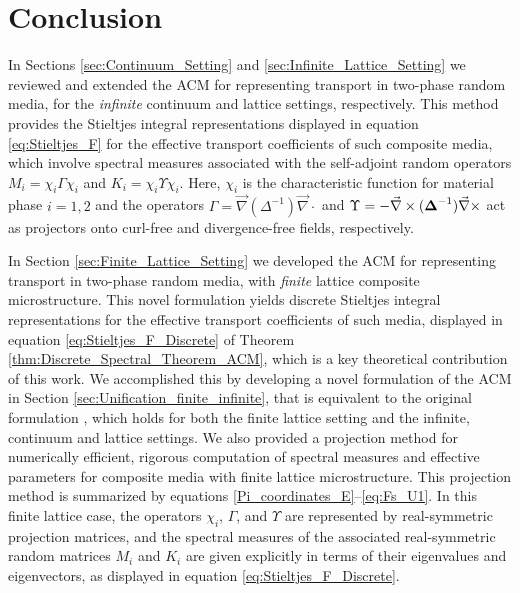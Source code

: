 \documentclass{cmslatex}
\newcommand\bDelta{\mbox{\boldmath${\Delta}$}}
\begin{document}
\section{Conclusion}
%
In Sections \ref{sec:Continuum_Setting} and
\ref{sec:Infinite_Lattice_Setting} we reviewed and extended the ACM for
representing transport in two-phase random media, for the
\emph{infinite} continuum and lattice settings, respectively. This
method provides the Stieltjes integral representations displayed in
equation \eqref{eq:Stieltjes_F} for the effective transport
coefficients of such composite media, which involve spectral measures
associated with the self-adjoint random operators $M_i=\chi_i\Gamma\chi_i$ and
$K_i=\chi_i\Upsilon\chi_i$. Here, $\chi_i$ is the characteristic function for material
phase $i=1,2$ and the operators $\Gamma=\vec{\nabla}(\Delta^{-1})\vec{\nabla}\cdot$ and
$\Upsilon=-\vec{\nabla}\times(\bDelta^{-1})\vec{\nabla}\times$ act as projectors onto curl-free
and divergence-free fields, respectively. 






In Section \ref{sec:Finite_Lattice_Setting} we developed the ACM for
representing transport in two-phase random media, with \emph{finite}
lattice composite microstructure. This novel formulation yields
discrete Stieltjes integral representations for the effective
transport coefficients of such media, displayed in equation
\eqref{eq:Stieltjes_F_Discrete} of Theorem
\ref{thm:Discrete_Spectral_Theorem_ACM}, which is a key theoretical
contribution of this work. We accomplished this by developing a novel
formulation of the ACM in Section
\ref{sec:Unification_finite_infinite}, that is equivalent to the
original formulation \cite{Golden:CMP-473}, which holds for both the
finite lattice setting and the infinite, continuum and lattice
settings. We also provided a projection method for numerically
efficient, rigorous computation of spectral measures and effective
parameters for composite media with finite lattice
microstructure. This projection method is summarized by equations 
\eqref{Pi_coordinates_E}--\eqref{eq:Fs_U1}. In this finite lattice
case, the operators $\chi_i$, $\Gamma$, and $\Upsilon$ are represented by
real-symmetric projection matrices, and the spectral measures of the
associated real-symmetric random matrices $M_i$ and $K_i$ are given
explicitly in terms of their eigenvalues and eigenvectors, as
displayed in equation \eqref{eq:Stieltjes_F_Discrete}.  
\end{document}
